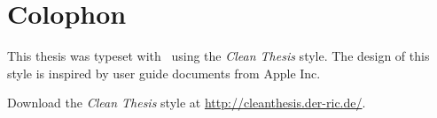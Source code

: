 %
\pagestyle{empty}
\hfill
\vfill
{}
\section*{Colophon}

This thesis was typeset with \LaTeXe\ using the \textit{Clean Thesis} style. The design of this style is inspired by user guide documents from Apple Inc.

Download the \textit{Clean Thesis} style at \url{http://cleanthesis.der-ric.de/}.
